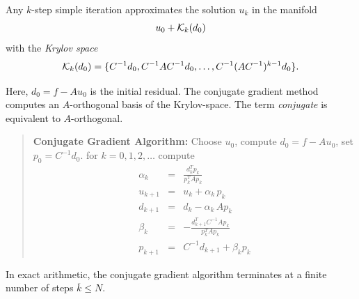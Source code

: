 \bigskip

Any $k$-step simple iteration approximates the solution $u_k$ in the
manifold
$$
u_0 + {\cal K}_k(d_0)
$$
with the {\em Krylov space}
$$
{\cal K}_k(d_0) = \{ C^{-1} d_0, C^{-1} A C^{-1} d_0, \ldots , C^{-1} (A C^{-1})^{k-1} d_0 \}.
$$

Here, $d_0 = f - A u_0$ is the initial residual.
The conjugate gradient method computes an $A$-orthogonal basis of the
Krylov-space. The term {\em conjugate} is equivalent to $A$-orthogonal.

\begin{quote}
{\bf Conjugate Gradient Algorithm:} \newline
Choose $u_0$, compute $d_0 = f - A u_0$, set $p_0 = C^{-1} d_0$. \newline
for $k = 0, 1, 2, \ldots$ compute
\begin{eqnarray*}
\alpha_k & = & \frac{d_k^T p_k}{p_k^T A p_k} \\
u_{k+1} & = & u_k + \alpha_k \, p_k \\
d_{k+1} & = & d_k - \alpha_k \, A p_k \\
\beta_k & = & -\frac{d_{k+1}^T C^{-1} A p_k}{p_k^T A p_k} \\
p_{k+1} & = & C^{-1} d_{k+1} + \beta_k p_k
\end{eqnarray*}
\end{quote}

\begin{remark} In exact arithmetic, the conjugate gradient algorithm 
terminates at a finite number of steps $\overline{k} \leq N$.
\end{remark}



